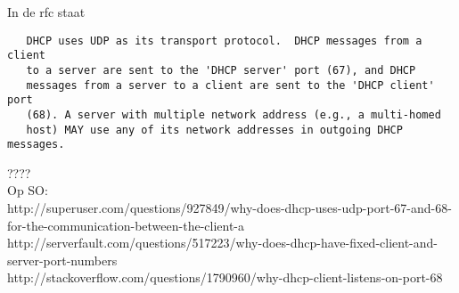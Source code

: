In de rfc staat
\begin{lstlisting}
   DHCP uses UDP as its transport protocol.  DHCP messages from a client
   to a server are sent to the 'DHCP server' port (67), and DHCP
   messages from a server to a client are sent to the 'DHCP client' port
   (68). A server with multiple network address (e.g., a multi-homed
   host) MAY use any of its network addresses in outgoing DHCP messages.
\end{lstlisting}
???? \\

Op SO: \\
http://superuser.com/questions/927849/why-does-dhcp-uses-udp-port-67-and-68-for-the-communication-between-the-client-a \\
http://serverfault.com/questions/517223/why-does-dhcp-have-fixed-client-and-server-port-numbers \\
http://stackoverflow.com/questions/1790960/why-dhcp-client-listens-on-port-68
